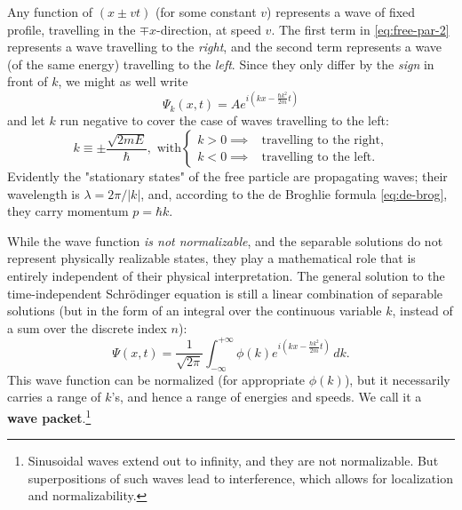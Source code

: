 \documentclass{article}
\begin{document}
Any function of $(x \pm vt)$ (for some constant $v$) represents a wave of fixed
profile, travelling in the $\mp x$-direction, at speed $v$. The first term in
\eqref{eq:free-par-2} represents a wave travelling to the \emph{right}, and the
second term represents a wave (of the same energy) travelling to the
\emph{left}. Since they only differ by the \emph{sign} in front of $k$, we
might as well write
\begin{equation} \label{eq:free-par-3}
  \Psi_k(x, t) = Ae^{i(kx - \frac{\hbar k^2}{2m}t)}
\end{equation}
and let $k$ run negative to cover the case of waves travelling to the left:
\begin{equation} \label{eq:free-par-k}
  k \equiv \pm\frac{\sqrt{2mE}}{\hbar},
  \text{ with}
  \begin{cases}
    k > 0 \implies &\text{travelling to the right}, \\
    k < 0 \implies &\text{travelling to the left}.
  \end{cases}
\end{equation}
Evidently the "stationary states" of the free particle are propagating waves;
their wavelength is $\lambda = 2\pi/|k|$, and, according to the de Broghlie
formula \eqref{eq:de-brog}, they carry momentum $p = \hbar k$.

While the wave function \emph{is not normalizable}, and the separable solutions
do not represent physically realizable states, they play a mathematical role
that is entirely independent of their physical interpretation. The general
solution to the time-independent Schr\"{o}dinger equation is still a linear
combination of separable solutions (but in the form of an integral over the
continuous variable $k$, instead of a sum over the discrete index $n$):
\begin{equation} \label{eq:free-par-psi}
  \boxed{
    \Psi(x, t)
    = \frac{1}{\sqrt{2\pi}}\int_{-\infty}^{+\infty}
      \phi(k)e^{i(kx - \frac{\hbar k^2}{2m}t)}
    \,dk.
  }
\end{equation}
This wave function can be normalized (for appropriate $\phi(k)$), but it
necessarily carries a range of $k$'s, and hence a range of energies and speeds.
We call it a \textbf{wave packet}.\footnote{Sinusoidal waves extend out to
infinity, and they are not normalizable. But superpositions of such waves lead
to interference, which allows for localization and normalizability.}
\end{document}

